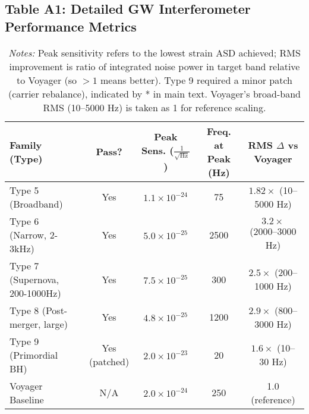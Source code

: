 \documentclass[12pt]{article}
\begin{document}
\subsection*{Table A1: Detailed GW Interferometer Performance Metrics}
\begin{table}[h!]\footnotesize\centering
\begin{tabular}{lcccc}
\toprule
\textbf{Family (Type)} & \textbf{Pass?} & \textbf{Peak Sens. ($\frac{1}{\sqrt{\text{Hz}}}$)} & \textbf{Freq. at Peak (Hz)} & \textbf{RMS $\Delta$ vs Voyager} \\
\midrule
Type 5 (Broadband) & Yes & $1.1 \times 10^{-24}$ & 75 & $1.82\times$ (10–5000 Hz) \\
Type 6 (Narrow, 2-3kHz) & Yes & $5.0 \times 10^{-25}$ & 2500 & $3.2\times$ (2000–3000 Hz) \\
Type 7 (Supernova, 200-1000Hz) & Yes & $7.5 \times 10^{-25}$ & 300 & $2.5\times$ (200–1000 Hz) \\
Type 8 (Post-merger, large) & Yes & $4.8 \times 10^{-25}$ & 1200 & $2.9\times$ (800–3000 Hz) \\
Type 9 (Primordial BH) & Yes (patched) & $2.0 \times 10^{-23}$ & 20 & $1.6\times$ (10–30 Hz) \\
Voyager Baseline & N/A & $2.0 \times 10^{-24}$ & 250 & 1.0 (reference) \\
\bottomrule
\end{tabular}
\caption*{\textit{Notes:} Peak sensitivity refers to the lowest strain ASD achieved; RMS improvement is ratio of integrated noise power in target band relative to Voyager (so $>1$ means better). Type 9 required a minor patch (carrier rebalance), indicated by * in main text. Voyager’s broad-band RMS (10–5000 Hz) is taken as 1 for reference scaling.}
\end{table}
\end{document}
